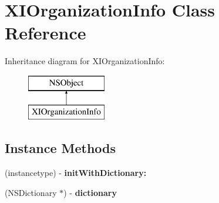 \hypertarget{class_x_i_organization_info}{}\section{X\+I\+Organization\+Info Class Reference}
\label{class_x_i_organization_info}
Inheritance diagram for X\+I\+Organization\+Info\+:\begin{figure}[H]
\begin{center}
\leavevmode
\includegraphics[height=2.000000cm]{class_x_i_organization_info}
\end{center}
\end{figure}
\subsection*{Instance Methods}
\begin{DoxyCompactItemize}
\item 
\hypertarget{class_x_i_organization_info_a67785830e09fe868e21c854b054fa771}{}\label{class_x_i_organization_info_a67785830e09fe868e21c854b054fa771} 
(instancetype) -\/ {\bfseries init\+With\+Dictionary\+:}
\item 
\hypertarget{class_x_i_organization_info_a9b5010b4e3246526d1c764384f759410}{}\label{class_x_i_organization_info_a9b5010b4e3246526d1c764384f759410} 
(N\+S\+Dictionary $\ast$) -\/ {\bfseries dictionary}
\end{DoxyCompactItemize}
